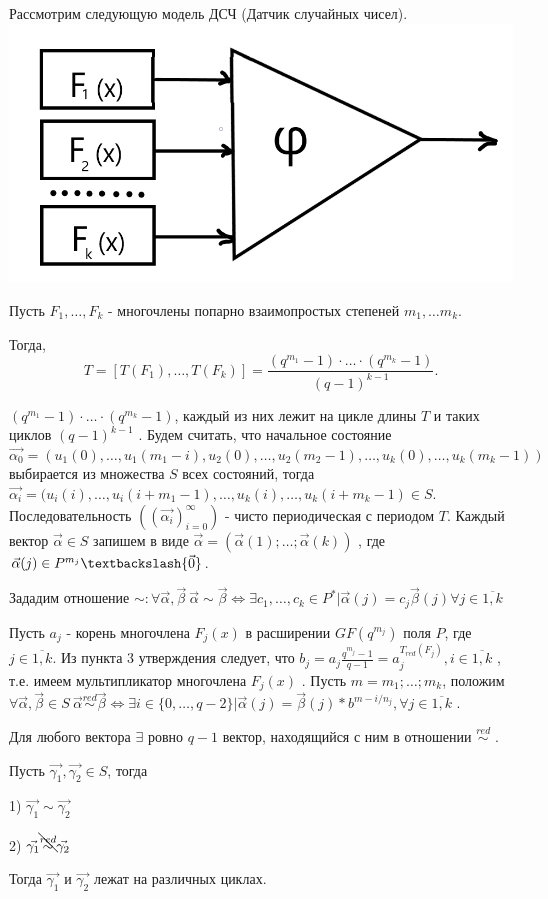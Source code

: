 Рассмотрим следующую модель ДСЧ (Датчик случайных чисел).\\

\includegraphics[scale=0.35]{DSC}

Пусть $F_1, \dots, F_k$ - многочлены попарно взаимопростых степеней $m_1, \dots m_k$.

Тогда,
$$
T=[T(F_1), \dots, T(F_k)] = \frac{(q^{m_1} - 1) \cdot \ldots \cdot (q^{m_k} - 1)}{(q-1)^{k-1}}.
$$

$(q^{m_1} - 1) \cdot \dotsc \cdot (q^{m_k} - 1)$, каждый из них лежит на цикле длины $T$ и таких циклов $(q-1)^{k-1}$ . Будем считать, что начальное состояние $\vec{\alpha_0} = (u_1(0), \dots, u_1(m_1 - i),u_2(0),\dotsc, u_2(m_2-1), \dots, u_k(0), \dots, u_k(m_k-1))$ выбирается из множества $S$ всех состояний, тогда $\vec{\alpha_i}=(u_i(i), \dots, u_i(i+m_1-1), \dots, u_k(i), \dots, u_k(i+m_k-1) \in S$.
Последовательность $((\vec{\alpha_i})_{i=0}^{\infty})$ - чисто периодическая с периодом $T$.
Каждый вектор $\vec{\alpha} \in S$ запишем в виде $\vec{\alpha} = (\vec{\alpha}(1); \dots; \vec{\alpha}(k))$ , где $\vec{\alpha}(j) \in P^{m_j} \textbackslash \{\vec{0}\}$.

Зададим отношение $\sim : \forall \vec{\alpha}, \vec{\beta} \: \vec{\alpha}\sim\vec{\beta} \Leftrightarrow \exists c_1, \dots, c_k \in P^*|\vec{\alpha}(j) = c_j \vec{\beta}(j) \forall j \in \overline{1,k}$

Пусть $a_j$ - корень многочлена $F_j(x)$ в расширении $GF(q^{m_j})$ поля $P$, где $j \in \overline{1,k}$. Из пункта 3 утверждения следует, что $b_j = a_j \frac{q^{m_j}-1}{q-1} = a_j^{T_{red}(F_j)}, i \in \overline{1,k}$ , т.е. имеем мультипликатор многочлена $F_j(x)$ . Пусть $m=m_1; \dots; m_k$, положим $\forall \vec{\alpha}, \vec{\beta} \in S \: \vec{\alpha} \stackrel{red}{\sim} \vec{\beta} \Leftrightarrow \exists i \in \{0, \dots, q-2\} | \vec{\alpha}(j) = \vec{\beta}(j) * b^{m-i/n_j}, \forall j \in \overline{1,k}$ .

Для любого вектора $\exists$ ровно $q-1$ вектор, находящийся с ним в отношении $\stackrel{red}{\sim}$ .

\thr
Пусть $\vec{\gamma_1}, \vec{\gamma_2} \in S$, тогда

1) $\vec{\gamma_1} \sim \vec{\gamma_2}$

2) $\vec{\gamma_1} \bcancel{\stackrel{red}{\sim}} \vec{\gamma_2}$%

Тогда $\vec{\gamma_1}$ и $\vec{\gamma_2}$ лежат на различных циклах. 